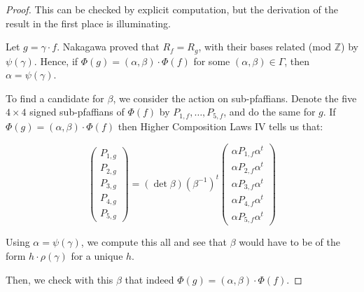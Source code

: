 \documentclass{report}
\begin{document}
\begin{proof}
This can be checked by explicit computation, but the derivation of the result in the first place is illuminating.

Let $g = \gamma \cdot f$.  Nakagawa proved that $R_f = R_g$, with their bases related (mod $\mathbb{Z}$) by $\psi(\gamma)$.  Hence, if $\Phi(g) = ( \alpha , \beta ) \cdot \Phi(f)$ for some $( \alpha , \beta ) \in \Gamma$, then $\alpha = \psi ( \gamma )$.

To find a candidate for $\beta$, we consider the action on sub-pfaffians.  Denote the five $4 \times 4$ signed sub-pfaffians of $\Phi(f)$ by $P_{1,f}, \ldots, P_{5,f}$, and do the same for $g$.  If $\Phi(g) = ( \alpha, \beta ) \cdot \Phi(f)$ then Higher Composition Laws IV tells us that:

\begin{equation}
\begin{pmatrix}
P_{1,g} \\ P_{2,g} \\ P_{3,g} \\ P_{4,g} \\ P_{5,g}
\end{pmatrix}
=
(\det \beta ) (\beta^{-1})^t
\begin{pmatrix}
\alpha P_{1,f} \alpha^t \\\alpha  P_{2,f} \alpha^t \\ \alpha P_{3,f} \alpha^t \\ \alpha P_{4,f} \alpha^t \\ \alpha P_{5,f} \alpha^t
\end{pmatrix}
\end{equation}

Using $\alpha = \psi ( \gamma )$, we compute this all and see that $\beta$ would have to be of the form $h \cdot \rho( \gamma )$ for a unique $h$.

Then, we check with this $\beta$ that indeed $\Phi(g) = (\alpha,\beta) \cdot \Phi(f)$.
\end{proof}
\end{document}
